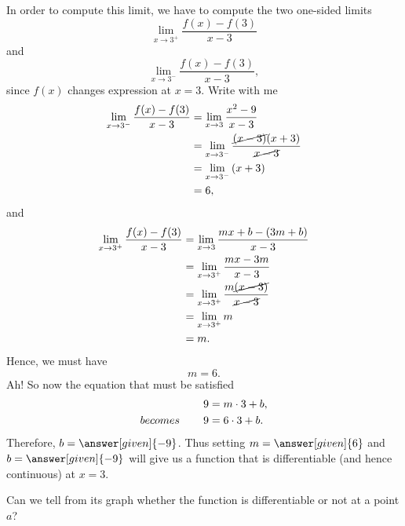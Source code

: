\documentclass{ximera}
\begin{document}
\begin{example}
\begin{explanation}
		In order to compute this limit, we have to compute the two one-sided limits
		 \[ \lim_{x\to 3^{+}}\frac{f(x)-f(3)}{x-3} \]
		and
		\[ \lim_{x\to 3^{-}}\frac{f(x)-f(3)}{x-3}, \]
		since  $f(x)$ changes expression at $x=3$.
		Write with me
		 \begin{align*}
		        \lim_{x\to 3^{-}}\frac{f(x)-f(3)}{x-3}&= \lim_{x\to 3}\frac{x^2 -9}{x-3}\\
		      &= \lim_{x\to 3^{-}}\frac{\cancel{(x-3)}(x+3)}{\cancel{x-3}}\\
		      &= \lim_{x\to 3^{-}}\left(x+3\right)\\
		      &=6,
		\end{align*}
		    and
		\begin{align*}
		        \lim_{x\to 3^{+}}\frac{f(x)-f(3)}{x-3}&= \lim_{x\to 3}\frac{mx+b -(3m+b)}{x-3}\\
		          &= \lim_{x\to 3^{+}}\frac{mx-3m}{x-3}\\
			   &= \lim_{x\to 3^{+}}\frac{m\cancel{(x-3)}}{\cancel{x-3}}\\
		         &= \lim_{x\to 3^{+}}m\\
		         &=m.
		 \end{align*}
		    Hence, we must have
		   \[ m=6.\]
		    Ah! So now the equation that must be satisfied
		    \begin{align*}
		      9 &= m\cdot 3 + b,\\
		    becomes\hspace{0.3in}  9 &= 6\cdot 3 + b.\\
		    \end{align*}
		   Therefore, $b=\answer[given]{-9}$. Thus setting $m=\answer[given]{6}$ and
		    $b=\answer[given]{-9}$ will give us a function that is differentiable (and hence
		    continuous) at $x=3$.
		   
	  \end{explanation}
\end{example}
Can we tell from its graph whether the function is differentiable or not at a point $a$?
\end{document}
